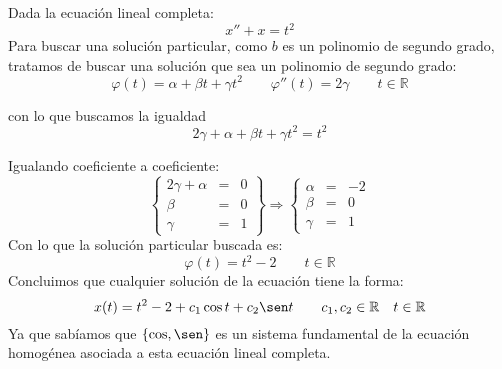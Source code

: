 \begin{ejemplo}
    Dada la ecuación lineal completa:
    \begin{equation*}
        x'' + x = t^2
    \end{equation*}
    Para buscar una solución particular, como $b$ es un polinomio de segundo grado, tratamos de buscar una solución que sea un polinomio de segundo grado:
    \begin{equation*}
        \varphi(t) = \alpha + \beta t + \gamma t^2 \qquad  \varphi''(t) = 2\gamma \qquad t\in \mathbb{R}
    \end{equation*}

    con lo que buscamos la igualdad
    \begin{equation*}
        2\gamma + \alpha + \beta t + \gamma t^2 = t^2
    \end{equation*}

    Igualando coeficiente a coeficiente:
    \begin{equation*}
        \left\{\begin{array}{rll}
                2\gamma + \alpha &=& 0 \\
                \beta &=& 0 \\
                \gamma &=& 1
        \end{array}\right\} \Longrightarrow 
        \left\{\begin{array}{rlr}
                \alpha &=& -2 \\
                \beta &=& 0 \\
                \gamma &=& 1
        \end{array}\right. 
    \end{equation*}
    Con lo que la solución particular buscada es:
    \begin{equation*}
        \varphi(t) = t^2 - 2 \qquad t\in \mathbb{R}
    \end{equation*}
    Concluimos que cualquier solución de la ecuación tiene la forma:
    \begin{equation*}
        x(t) = t^2 - 2 + c_1 \cos t + c_2 \sen t \qquad c_1,c_2\in \mathbb{R} \quad t\in \mathbb{R}
    \end{equation*}
    Ya que sabíamos que $\{\cos, \sen\}$ es un sistema fundamental de la ecuación homogénea asociada a esta ecuación lineal completa.
\end{ejemplo}

